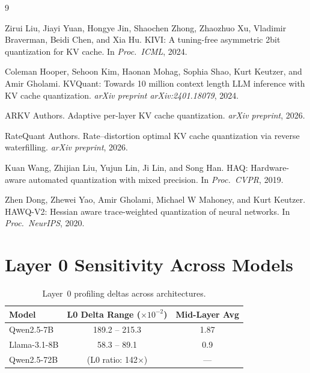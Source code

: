 \documentclass[11pt,a4paper]{article}
\begin{document}
\begin{thebibliography}{9}

Zirui Liu, Jiayi Yuan, Hongye Jin, Shaochen Zhong, Zhaozhuo Xu, Vladimir Braverman, Beidi Chen, and Xia Hu.
\newblock KIVI: A tuning-free asymmetric 2bit quantization for KV cache.
\newblock In \emph{Proc.\ ICML}, 2024.

Coleman Hooper, Sehoon Kim, Haonan Mohag, Sophia Shao, Kurt Keutzer, and Amir Gholami.
\newblock KVQuant: Towards 10 million context length LLM inference with KV cache quantization.
\newblock \emph{arXiv preprint arXiv:2401.18079}, 2024.

ARKV Authors.
\newblock Adaptive per-layer KV cache quantization.
\newblock \emph{arXiv preprint}, 2026.

RateQuant Authors.
\newblock Rate--distortion optimal KV cache quantization via reverse waterfilling.
\newblock \emph{arXiv preprint}, 2026.

Kuan Wang, Zhijian Liu, Yujun Lin, Ji Lin, and Song Han.
\newblock HAQ: Hardware-aware automated quantization with mixed precision.
\newblock In \emph{Proc.\ CVPR}, 2019.

Zhen Dong, Zhewei Yao, Amir Gholami, Michael W Mahoney, and Kurt Keutzer.
\newblock HAWQ-V2: Hessian aware trace-weighted quantization of neural networks.
\newblock In \emph{Proc.\ NeurIPS}, 2020.

\end{thebibliography}

\appendix
\section{Layer 0 Sensitivity Across Models}
\label{app:l0}

\begin{table}[h]
\centering
\small
\caption{Layer~0 profiling deltas across architectures.}
\begin{tabular}{lcc}
\toprule
\textbf{Model} & \textbf{L0 Delta Range ($\times 10^{-2}$)} & \textbf{Mid-Layer Avg} \\
\midrule
Qwen2.5-7B & 189.2 -- 215.3 & 1.87 \\
Llama-3.1-8B & 58.3 -- 89.1 & 0.9 \\
Qwen2.5-72B & (L0 ratio: 142$\times$) & --- \\
\bottomrule
\end{tabular}
\end{table}
\end{document}
